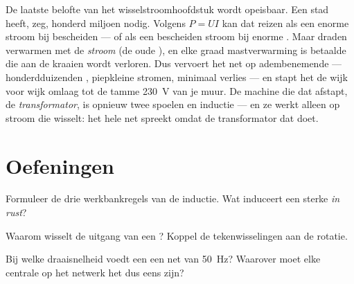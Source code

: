 \begin{remark}\label{rem:g9:alternator:transport}
De laatste belofte van het wisselstroomhoofdstuk wordt opeisbaar. Een
stad heeft, zeg, honderd miljoen  nodig. Volgens $P = U I$
kan dat  reizen als een enorme stroom bij bescheiden
 --- of als een bescheiden stroom bij enorme
. Maar draden verwarmen met de
\emph{stroom} (de oude ), en elke graad
mastverwarming is betaalde  die aan de kraaien wordt
verloren. Dus vervoert het net op adembenemende
 --- honderdduizenden ,
piepkleine stromen, minimaal verlies --- en stapt het de
 wijk voor wijk omlaag tot de tamme \qty{230}{V} van
je muur. De machine die dat afstapt, de \emph{transformator}, is
opnieuw twee spoelen en inductie --- en ze werkt alleen op stroom die
wisselt: het hele net spreekt  omdat de transformator dat
doet.
\end{remark}

\section{Oefeningen}

\begin{exercise}[$\star$]\label{exo:g9:alternator:1}
Formuleer de drie werkbankregels van de inductie. Wat induceert een
sterke  \emph{in rust}?
\end{exercise}

\begin{exercise}[$\star$]\label{exo:g9:alternator:2}
Waarom wisselt de uitgang van een ? Koppel de
tekenwisselingen aan de rotatie.
\end{exercise}

\begin{exercise}[$\star$]\label{exo:g9:alternator:3}
Bij welke draaisnelheid voedt een
 een net van \qty{50}{Hz}? Waarover moet
elke centrale op het netwerk het dus eens zijn?
\end{exercise}

